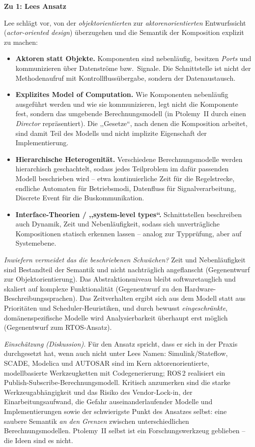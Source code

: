 \begin{loesung}
\textbf{Zu 1: Lees Ansatz}

Lee schlägt vor, von der \emph{objektorientierten} zur \emph{aktorenorientierten} Entwurfssicht
(\emph{actor-oriented design}) überzugehen und die Semantik der Komposition explizit zu machen:
\begin{itemize}
    \item \textbf{Aktoren statt Objekte.} Komponenten sind nebenläufig, besitzen \emph{Ports} und
          kommunizieren über Datenströme bzw.\ Signale. Die Schnittstelle ist nicht der
          Methodenaufruf mit Kontrollflussübergabe, sondern der Datenaustausch.
    \item \textbf{Explizites Model of Computation.} Wie Komponenten nebenläufig ausgeführt werden
          und wie sie kommunizieren, legt nicht die Komponente fest, sondern das umgebende
          Berechnungsmodell (in Ptolemy~II durch einen \emph{Director} repräsentiert). Die
          ,,Gesetze``, nach denen die Komposition arbeitet, sind damit Teil des Modells und nicht
          implizite Eigenschaft der Implementierung.
    \item \textbf{Hierarchische Heterogenität.} Verschiedene Berechnungsmodelle werden hierarchisch
          geschachtelt, sodass jedes Teilproblem im dafür passenden Modell beschrieben wird -- etwa
          kontinuierliche Zeit für die Regelstrecke, endliche Automaten für Betriebsmodi,
          Datenfluss für Signalverarbeitung, Discrete Event für die Buskommunikation.
    \item \textbf{Interface-Theorien / ,,system-level types``.} Schnittstellen beschreiben auch
          Dynamik, Zeit und Nebenläufigkeit, sodass sich unverträgliche Kompositionen statisch
          erkennen lassen -- analog zur Typprüfung, aber auf Systemebene.
\end{itemize}

\emph{Inwiefern vermeidet das die beschriebenen Schwächen?} Zeit und Nebenläufigkeit sind Bestandteil
der Semantik und nicht nachträglich angeflanscht (Gegenentwurf zur Objektorientierung). Das
Abstraktionsniveau bleibt softwaretauglich und skaliert auf komplexe Funktionalität (Gegenentwurf zu
den Hardware-Beschreibungssprachen). Das Zeitverhalten ergibt sich aus dem Modell statt aus
Prioritäten und Scheduler-Heuristiken, und durch bewusst \emph{eingeschränkte}, domänenspezifische
Modelle wird Analysierbarkeit überhaupt erst möglich (Gegenentwurf zum RTOS-Ansatz).

\emph{Einschätzung (Diskussion).} Für den Ansatz spricht, dass er sich in der Praxis durchgesetzt hat,
wenn auch nicht unter Lees Namen: Simulink/Stateflow, SCADE, Modelica und AUTOSAR sind im Kern
aktorenorientierte, modellbasierte Werkzeugketten mit Codegenerierung; ROS\,2 realisiert ein
Publish-Subscribe-Berechnungsmodell. Kritisch anzumerken sind die starke Werkzeugabhängigkeit und
das Risiko des Vendor-Lock-in, der Einarbeitungsaufwand, die Gefahr auseinanderlaufender Modelle und
Implementierungen sowie der schwierigste Punkt des Ansatzes selbst: eine saubere Semantik \emph{an
den Grenzen} zwischen unterschiedlichen Berechnungsmodellen. Ptolemy~II selbst ist ein
Forschungswerkzeug geblieben -- die Ideen sind es nicht.


\end{loesung}
